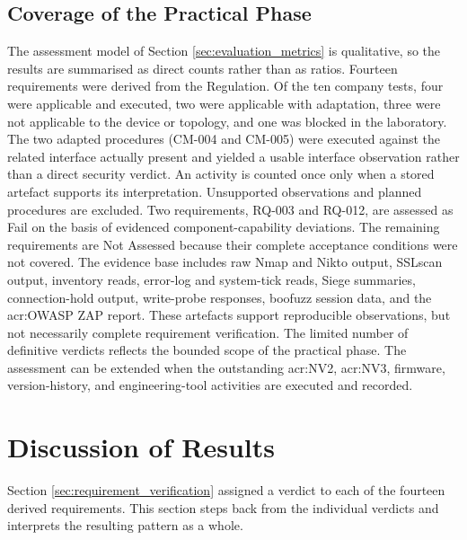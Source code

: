 \subsection{Coverage of the Practical Phase}
\label{subsec:metrics_application} 
The assessment model of Section \ref{sec:evaluation_metrics} is qualitative, so the results are summarised as direct counts rather than as ratios. Fourteen requirements were derived from the Regulation. Of the ten company tests, four were applicable and executed, two were applicable with adaptation, three were not applicable to the device or topology, and one was blocked in the laboratory. The two adapted procedures (CM-004 and CM-005) were executed against the related interface actually present and yielded a usable interface observation rather than a direct security verdict. An activity is counted once only when a stored artefact supports its interpretation. Unsupported observations and planned procedures are excluded. Two requirements, RQ-003 and RQ-012, are assessed as Fail on the basis of evidenced component-capability deviations. The remaining requirements are Not Assessed because their complete acceptance conditions were not covered.
The evidence base includes raw Nmap and Nikto output, SSLscan output, inventory reads, error-log and system-tick reads, Siege summaries, connection-hold output, write-probe responses, boofuzz session data, and the \gls{acr:OWASP} ZAP report. These artefacts support reproducible observations, but not necessarily complete requirement verification. The limited number of definitive verdicts reflects the bounded scope of the practical phase. The assessment can be extended when the outstanding \gls{acr:NV2}, \gls{acr:NV3}, firmware, version-history, and engineering-tool activities are executed and recorded.



\section{Discussion of Results}
\label{sec:discussion} 
Section \ref{sec:requirement_verification} assigned a verdict to each of the fourteen derived requirements. This section steps back from the individual verdicts and interprets the resulting pattern as a whole.

